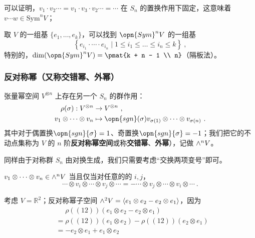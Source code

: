 可以证明，$v_1 \cdot v_2 \cdots = v_1 \cdot v_3 \cdot v_2 \cdots = \cdots$ 在 $S_n$ 的置换作用下固定，这意味着$v \cdots w \in \text{Sym}^n V$；

取 $V$ 的一组基 $\{e_1, \dots, e_k\}$，可以找到 $\opn{Sym}^n V$ 的一组基
\begin{equation}
\left\{ e_{i_1} \cdot \cdots \cdot e_{i_n} \mid 1 \leq i_1 \leq \dots \leq i_n \leq k \right\}~,
\end{equation}
特别的，$\dim(\opn{Sym}^n V) = \pmat{k + n - 1 \\ n}$（隔板法）。

\subsubsection{反对称幂（又称交错幂、外幂）}

张量幂空间 $V^{\otimes n}$ 上存在另一个 $S_n$ 的群作用：
\begin{equation}
\begin{aligned}
\rho(\sigma): V^{\otimes n} &\to V^{\otimes n}~, \\
v_1 \otimes \cdots \otimes v_n &\mapsto \opn{sgn}(\sigma) v_{\sigma(1)} \otimes \cdots \otimes v_{\sigma(n)}~.
\end{aligned}
\end{equation}
其中对于偶置换$\opn{sgn}{\sigma} = 1$、奇置换$\opn{sgn}{\sigma} = -1$；我们把它的不动点集称为 $V$ 的 $n$ 阶\textbf{反对称幂空间}或称\textbf{交错幂}、\textbf{外幂}），记做 ${\large \wedge}^n V$。

同样由于对称群 $S_n$ 由对换生成，我们只需要考虑“交换两项变号”即可。
\begin{theorem}{}
$v_1 \otimes \cdots \otimes v_n \in {\large \wedge}^n V$ 当且仅当对任意的的 $i, j$，
\begin{equation}
\cdots \otimes v_i \otimes \cdots \otimes v_j \otimes \cdots = - \cdots \otimes v_j \otimes \cdots \otimes v_i \otimes \cdots~.
\end{equation}
\end{theorem}


\begin{example}{}\label{ex_vecSAS_2}
考虑 $V = \mathbb{R}^2$；反对称幂子空间 ${\large \wedge}^2 V = \langle e_1 \otimes e_2 - e_2 \otimes e_1 \rangle$，因为
\begin{equation}
\begin{aligned}
&\phantom{=} \rho((1 2))(e_1 \otimes e_2 - e_2 \otimes e_1) \\
&= \rho((1 2))(e_1 \otimes e_2) - \rho((1 2))(e_2 \otimes e_1) \\
&= - e_2 \otimes e_1 + e_1 \otimes e_2
\end{aligned}~
\end{equation}
\end{example}

